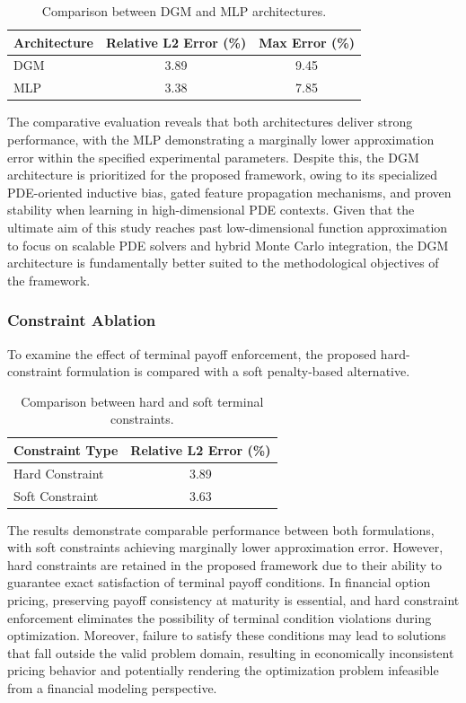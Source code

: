 \documentclass[12pt, a4paper]{article}
\begin{document}
\begin{table}[h]
    \centering
    \caption{Comparison between DGM and MLP architectures.}
    \label{tab:architecture_ablation}
    \begin{tabular}{|l|c|c|}
        \hline
        \textbf{Architecture} & \textbf{Relative L2 Error (\%)} & \textbf{Max Error (\%)} \\
        \hline
        DGM & 3.89 & 9.45 \\
        MLP & 3.38 & 7.85 \\
        \hline
    \end{tabular}
\end{table}

The comparative evaluation reveals that both architectures deliver
strong performance, with the MLP demonstrating a marginally lower
approximation error within the specified experimental parameters.
Despite this, the DGM architecture is prioritized for the proposed
framework, owing to its specialized PDE-oriented inductive bias, gated
feature propagation mechanisms, and proven stability when learning in
high-dimensional PDE contexts. Given that the ultimate aim of this
study reaches past low-dimensional function approximation to focus on
scalable PDE solvers and hybrid Monte Carlo integration, the DGM
architecture is fundamentally better suited to the methodological
objectives of the framework.

\subsubsection{Constraint Ablation}

To examine the effect of terminal payoff enforcement, the proposed
hard-constraint formulation is compared with a soft penalty-based
alternative.

\begin{table}[h]
    \centering
    \caption{Comparison between hard and soft terminal constraints.}
    \label{tab:constraint_ablation}
    \begin{tabular}{|l|c|}
        \hline
        \textbf{Constraint Type} & \textbf{Relative L2 Error (\%)} \\
        \hline
        Hard Constraint & 3.89 \\
        Soft Constraint & 3.63 \\
        \hline
    \end{tabular}
\end{table}

The results demonstrate comparable performance between both
formulations, with soft constraints achieving marginally lower
approximation error. However, hard constraints are retained in the
proposed framework due to their ability to guarantee exact satisfaction
of terminal payoff conditions. In financial option pricing, preserving
payoff consistency at maturity is essential, and hard constraint
enforcement eliminates the possibility of terminal condition violations
during optimization. Moreover, failure to satisfy these conditions may
lead to solutions that fall outside the valid problem domain, resulting
in economically inconsistent pricing behavior and potentially rendering
the optimization problem infeasible from a financial modeling
perspective.
\end{document}
